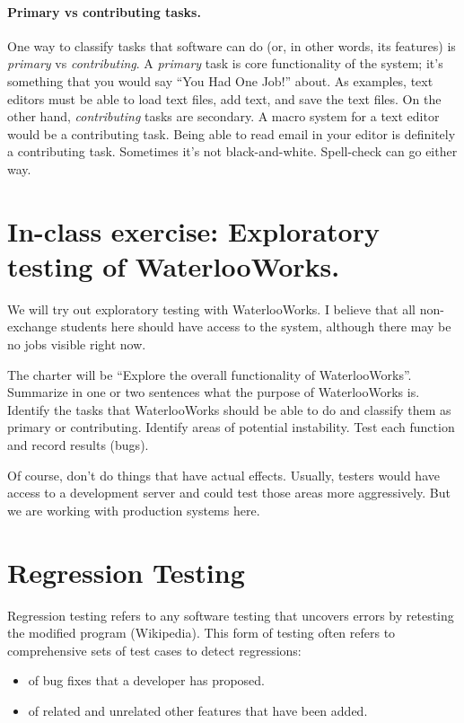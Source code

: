 \documentclass[11pt]{article}
\begin{document}
\paragraph{Primary vs contributing tasks.}
One way to classify tasks that software can do (or, in other words, its features) is
\emph{primary} vs \emph{contributing}. A \emph{primary} task is core functionality of
the system; it's something that you would say ``You Had One Job!'' about. As examples,
text editors must be able to load text files, add text, and save the text files.
On the other hand, \emph{contributing} tasks are secondary. A macro system for a text
editor would be a contributing task. Being able to read email in your editor is
definitely a contributing task. Sometimes it's not black-and-white. Spell-check
can go either way.

\vspace*{-1em}
\section*{In-class exercise: Exploratory testing of WaterlooWorks.}
\vspace*{-1em} We will try out exploratory testing with
WaterlooWorks. I believe that all non-exchange students here should have
access to the system, although there may be no jobs visible right now.

The charter will be ``Explore the overall functionality of WaterlooWorks''. Summarize
in one or two sentences what the purpose of WaterlooWorks is. Identify the tasks that
WaterlooWorks should be able to do and classify them as primary or contributing. Identify
areas of potential instability. Test each function and record results (bugs).

Of course, don't do things that have actual effects. Usually, testers would have access 
to a development server and could test those areas more aggressively. But we are working
with production systems here.

\section*{Regression Testing}

Regression testing refers to any software testing that uncovers errors by retesting the modified program (Wikipedia). This form of testing often refers to comprehensive sets of test cases to detect regressions:
\begin{itemize}[noitemsep]
\item of bug fixes that a developer has proposed.
\item of related and unrelated other features that have been added.
\end{itemize}
\end{document}
